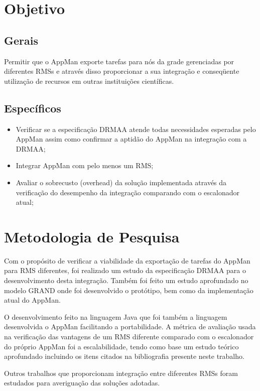 \section{Objetivo}

\subsection{Gerais}
Permitir que o AppMan exporte tarefas para nós da grade gerenciadas por diferentes RMSs e através disso proporcionar a sua integração e conseqüente utilização de recursos em outras instituições científicas.

\subsection{Específicos}
    \begin{itemize}
        \item Verificar se a especificação DRMAA atende todas necessidades esperadas pelo AppMan assim como confirmar a aptidão do AppMan na integração com a DRMAA;
        \item Integrar AppMan com pelo menos um RMS;
        \item Avaliar o sobrecusto (overhead) da solução implementada através da verificação do desempenho da integração comparando com o escalonador atual;
    \end{itemize}
    
\section{Metodologia de Pesquisa}    
Com o propósito de verificar a viabilidade da exportação de tarefas do AppMan para RMS diferentes, foi realizado um estudo da especificação DRMAA para o desenvolvimento desta integração. Também foi feito um estudo aprofundado no modelo GRAND onde foi desenvolvido o protótipo, bem como da implementação atual do AppMan.

O desenvolvimento feito na linguagem Java que foi também a linguagem desenvolvida o AppMan facilitando a portabilidade. A métrica de avaliação usada na verificação das vantagens de um RMS diferente comparado com o escalonador do próprio AppMan foi a escalabilidade,  tendo como base um estudo teórico aprofundado incluindo os itens citados na bibliografia presente neste trabalho.

Outros trabalhos que proporcionam integração entre diferentes RMSs foram estudados para averiguação das soluções adotadas. 

